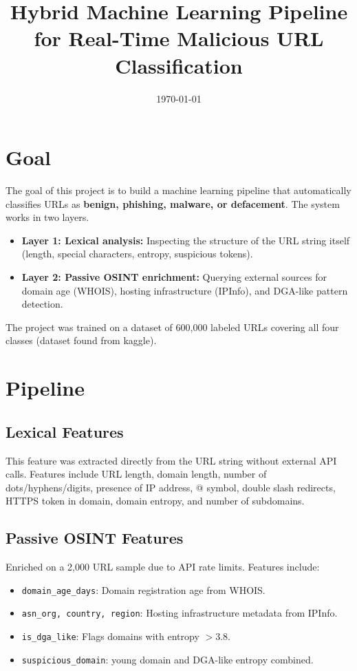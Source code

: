 \documentclass[11pt,a4paper]{article}
\title{\textbf{Hybrid Machine Learning Pipeline for Real-Time Malicious URL Classification}}
\author{}
\date{\today}
\begin{document}
\maketitle

\section{Goal}
The goal of this project is to build a machine learning pipeline that automatically classifies URLs as
 \textbf{benign, phishing, malware, or defacement}. The system works in two layers.
\begin{itemize}
    \item \textbf{Layer 1: Lexical analysis:} Inspecting the structure of the URL string itself (length, special characters, entropy, suspicious tokens).
    \item \textbf{Layer 2: Passive OSINT enrichment:} Querying external sources for domain age (WHOIS), hosting infrastructure (IPInfo), and DGA-like pattern detection.
\end{itemize}
The project was trained on a dataset of 600,000 labeled URLs covering all four classes (dataset found from kaggle).

\section{Pipeline}

\subsection{Lexical Features}
This feature was extracted directly from the URL string without external API calls. 
Features include URL length, domain length, number of dots/hyphens/digits, presence 
of IP address, @ symbol, double slash redirects, HTTPS token in domain, domain entropy,
and number of subdomains.

\subsection{Passive OSINT Features}
Enriched on a 2,000 URL sample due to API rate limits. Features include:
\begin{itemize}
    \item \texttt{domain\_age\_days}: Domain registration age from WHOIS.
    \item \texttt{asn\_org, country, region}: Hosting infrastructure metadata from IPInfo.
    \item \texttt{is\_dga\_like}: Flags domains with entropy $> 3.8$.
    \item \texttt{suspicious\_domain}: young domain and DGA-like entropy combined.
\end{itemize}
\end{document}
